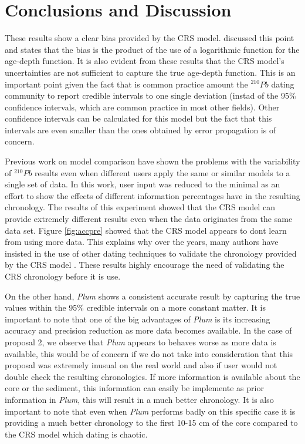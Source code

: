 \documentclass [10pt] {article}
\begin{document}
\section{Conclusions and Discussion}

These results show a clear bias provided by the CRS model. 
\citet{Aquino2018} discussed this point and states that the bias is the product of the use of a logarithmic function for the age-depth function. 
It is also evident from these results that the CRS model's uncertainties are not sufficient to capture the true age-depth function. 
This is an important point given the fact that is common practice amount the $^{210}Pb$ dating community to report credible intervals to one single deviation (instad of the 95\% confidence intervals, which are common practice in most other fields).
Other confidence intervals can be calculated for this model \citep{Sanchez-Cabeza2014} but the fact that this intervals are even smaller than the ones obtained by error propagation \citep{Appleby2001} is of concern. 

Previous work on model comparison \citep{Barsanti2020} have shown the problems with the variability of $^{210}Pb$ results even when different users apply the same or similar models to a single set of data.
In this work, user input was reduced to the minimal as an effort to show the effects of different information percentages have in the resulting chronology. 
The results of this experiment showed that the CRS model can provide extremely different results even when the data originates from the same data set. 
Figure \ref{fig:accpre} showed that the CRS model appears to dont learn from using more data.
This explains why over the years, many authors have insisted in the use of other dating techniques to validate the chronology provided by the CRS model \citep{Sanchez-Cabeza2012,Barsanti2020,Aquino2020}.
These results highly encourage the need of validating the CRS chronology before it is use.


On the other hand, \textit{Plum} shows a consistent accurate result by capturing the true values within the 95\% credible intervals on a more constant matter. 
It is important to note that one of the big advantages of \textit{Plum} is its increasing accuracy and precision reduction as more data becomes available.
In the case of proposal 2, we observe that \textit{Plum} appears to behaves worse as more data is available, this would be of concern if we do not take into consideration that this proposal was extremely inusual on the real world and also if user would not double check the resulting chronologies. 
If more information is available about the core or the sediment, this information can easily be implemente as prior information in \textit{Plum}, this will result in a much better chronology.
It is also important to note that even when \textit{Plum} performs badly on this specific case it is providing a much better chronology to the first 10-15 cm of the core compared to the CRS model which dating is chaotic.
\end{document}
